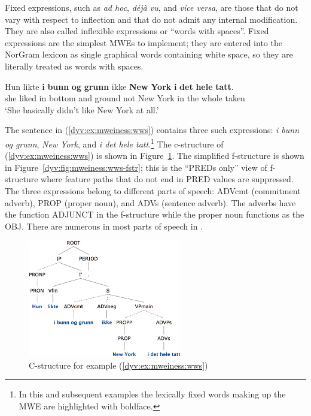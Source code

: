 \documentclass[output=paper]{langsci/langscibook}
\begin{document}
Fixed expressions, such as \textit{ad hoc}, \textit{déjà vu}, and \textit{vice versa}, are those that do not vary with respect to inflection and that do not admit any internal modification.
They are also called inflexible expressions or ``words with spaces''.
Fixed expressions are the simplest MWEs to implement; they are entered into the NorGram lexicon as single graphical words containing white space, so they are literally treated as words with spaces.

\ea\label{dyv:ex:mweiness:wws}
\gll Hun likte \textbf{i} \textbf{bunn} \textbf{og} \textbf{grunn} ikke \textbf{New} \textbf{York} \textbf{i} \textbf{det} \textbf{hele} \textbf{tatt}. \\
     she liked in bottom and ground not New York in the whole taken\\
\glt `She basically didn’t like New York at all.’
\z

The sentence in (\ref{dyv:ex:mweiness:wws}) contains three such expressions: \textit{i bunn og grunn}, \textit{New York}, and \textit{i det hele tatt}.\footnote{In this and subsequent examples the lexically fixed words making up the MWE are highlighted with boldface.}
The c-structure of (\ref{dyv:ex:mweiness:wws}) is shown in Figure~\ref{dyv:fig:mweiness:wws-cstr}.
The simplified f-structure is shown in Figure~\ref{dyv:fig:mweiness:wws-fstr}; this is the ``\textsf{PRED}s only'' view of f-structure where feature paths that do not end in \textsf{PRED} values are suppressed. 
The three expressions belong to different parts of speech: \textsf{ADVcmt} (commitment adverb), \textsf{PROP} (proper noun), and \textsf{ADVs} (sentence adverb).
The adverbs have the function \textsf{ADJUNCT} in the f-structure while the proper noun functions as the \textsf{OBJ}.
There are numerous  in most parts of speech in .

%
\begin{figure}
  \includegraphics[width=0.6\textwidth]{figures/wws-cstr}
  \caption{C-structure for example (\ref{dyv:ex:mweiness:wws})}
  \label{dyv:fig:mweiness:wws-cstr}
\end{figure}
\end{document}
